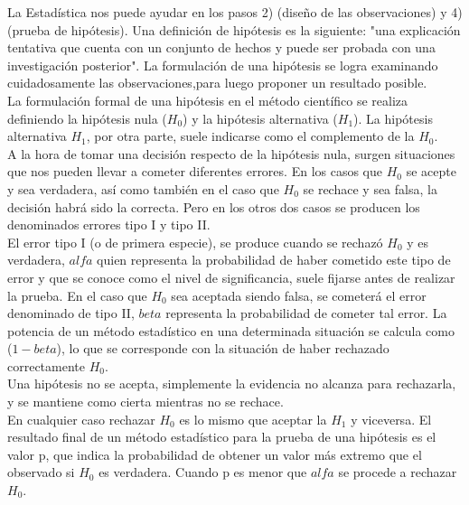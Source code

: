 \documentclass[12pt,letterpaper]{article}\usepackage[]{graphicx}\usepackage[]{color}
\begin{document}
La Estad\'istica nos puede ayudar en los pasos 2) (dise\~no de las observaciones) y 4) (prueba de hip\'otesis). Una definici\'on de hip\'otesis es la siguiente: "una explicaci\'on tentativa que cuenta con un conjunto de hechos y puede ser probada con una investigaci\'on posterior". La formulaci\'on de una hip\'otesis se logra examinando cuidadosamente las observaciones,para luego proponer un resultado posible.\\

La formulaci\'on formal de una hip\'otesis en el m\'etodo cient\'ifico se realiza definiendo la hip\'otesis nula ($H_0$) y la hip\'otesis alternativa ($H_1$). La hip\'otesis alternativa 
$H_1$, por otra parte, suele indicarse como el complemento de la $H_0$.\\

A la hora de tomar una decisi\'on respecto de la hip\'otesis nula, surgen situaciones que nos pueden llevar a cometer diferentes errores. En los casos que $H_0$ se acepte y sea verdadera, as\'i como tambi\'en en el caso que $H_0$ se rechace y sea falsa, la decisi\'on habr\'a sido la correcta. Pero en los otros dos casos se producen los denominados errores tipo I y tipo II.\\

El error tipo I (o de primera especie), se produce cuando se rechaz\'o $H_0$ y es verdadera,
$alfa$ quien representa la probabilidad de haber cometido este tipo de error y que se conoce como el nivel de significancia, suele fijarse antes de realizar la prueba. En el caso que 
$H_0$ sea aceptada siendo falsa, se cometer\'a el error denominado de tipo II, $beta$ representa la probabilidad de cometer tal error. La potencia de un m\'etodo estad\'istico en una determinada situaci\'on se calcula como ($1-beta$), lo que se corresponde con la situaci\'on de haber rechazado correctamente $H_0$.\\

Una hip\'otesis no se acepta, simplemente la evidencia no alcanza para rechazarla, y se mantiene como cierta mientras no se rechace.\\

En cualquier caso rechazar $H_0$ es lo mismo que aceptar la $H_1$ y viceversa. El resultado final de un m\'etodo estad\'istico para la prueba de una hip\'otesis es el valor p, que indica la probabilidad de obtener un valor m\'as extremo que el observado si $H_0$ es verdadera. Cuando p es menor que $alfa$ se procede a rechazar $H_0$.\\
\end{document}
